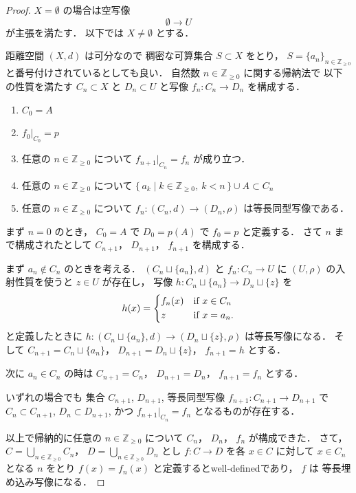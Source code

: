 \documentclass[leqno, 12pt]{jsarticle}
\newcommand{\zz}{\mathbb{Z}}
\newcommand{\yozz}[1]{\zz_{\ge #1}}
\newcommand{\restr}[2]{#1|_{#2}}
\begin{document}
\begin{proof}
$X=\emptyset$
の場合は空写像
\[
\emptyset\longrightarrow U
\]
が主張を満たす．
以下では
$X\neq\emptyset$
とする．

距離空間
$(X, d)$
は可分なので
稠密な可算集合
$S\subset X$
をとり，
$S=\{a_{n}\}_{n\in \yozz{0}}$
と番号付けされているとしても良い．
自然数
$n\in \yozz{0}$
に関する帰納法で
以下の性質を満たす
$C_{n}\subset X$
と
$D_{n}\subset U$
と写像
$f_{n}\colon  C_{n}\to D_{n}$
を構成する．
\begin{enumerate}[label=\textup{(\arabic*)}]
\item
$C_{0}=A$
\item
$\restr{f_{0}}{C_{0}}=p$
\item 
任意の
$n\in \yozz{0}$
について
$\restr{f_{n+1}}{C_{n}}=f_{n}$
が成り立つ．
\item
任意の
$n\in \yozz{0}$
について
$\{\,a_k\mid k\in\yozz{0},\ k<n\,\}\cup A\subset C_{n}$
\item
任意の%
$n\in \yozz{0}$%
について
$f_{n}\colon  (C_{n}, d)\to (D_{n}, \rho)$
は等長同型写像である．
\end{enumerate}
まず
$n=0$
のとき，
$C_{0}=A$
で
$D_{0}=p(A)$
で
$f_{0}=p$
と定義する．
さて
$n$
まで構成されたとして
 $C_{n+1}$，
 $D_{n+1}$，
 $f_{n+1}$
 を構成する．

まず
$a_{n}\not\in C_{n}$
のときを考える．
$(C_{n}\sqcup\{a_{n}\}, d)$
と
$f_{n}\colon  C_{n}\to U$
に
$(U, \rho)$
の入射性質を使うと
$z\in U$
が存在し，
写像
$h\colon  C_{n}\sqcup \{a_{n}\}\to D_{n}\sqcup \{z\}$%
を
\[
h(x)=
\begin{dcases}
	f_{n}(x) & \text{if
$x\in C_{n}$%
}\\
	z & \text{if
$x=a_{n}$%
}.
\end{dcases}
\]
と定義したときに
$h\colon (C_{n}\sqcup \{a_{n}\}, d)\to (D_{n}\sqcup \{z\}, \rho)$%
は等長写像になる．
そして%
$C_{n+1}=C_{n}\sqcup \{a_{n}\}$，
$D_{n+1}=D_n\sqcup\{z\}$，
$f_{n+1}=h$
とする．

次に
$a_{n}\in C_n$
の時は
$C_{n+1}=C_{n}$，
$D_{n+1}=D_{n}$，
$f_{n+1}=f_{n}$
とする．

いずれの場合でも
集合
$C_{n+1}$, 
$D_{n+1}$, 
等長同型写像
$f_{n+1}\colon C_{n+1}\to D_{n+1}$
で
$C_{n}\subset C_{n+1}$, 
$D_{n}\subset D_{n+1}$, 
かつ
$\restr{f_{n+1}}{C_{n}}=f_{n}$
となるものが存在する．


以上で帰納的に任意の
$n\in \yozz{0}$%
について
$C_{n}$，
$D_{n}$，
$f_{n}$
が構成できた．
さて，
$C=\bigcup_{n\in \yozz{0}}C_{n}$，
$D=\bigcup_{n\in \yozz{0}}D_{n}$
とし
$f\colon  C\to  D$
を各
$x\in C$
に対して
$x\in C_{n}$
となる
$n$
をとり
$f(x)=f_{n}(x)$
と定義するとwell-definedであり，
$f$%
は
等長埋め込み写像になる．





\end{proof}
\end{document}
